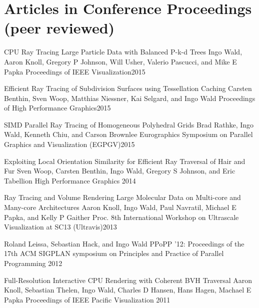 \documentclass[letterpaper,11pt]{moderncv}
\begin{document}
\medskip
\section{Articles in Conference Proceedings  (peer reviewed)}


  \cvbibitem 
    {CPU Ray Tracing Large Particle Data with Balanced P-k-d Trees}
    {Ingo Wald, Aaron Knoll, Gregory P Johnson, Will Usher, Valerio Pascucci, and Mike E Papka}
    {Proceedings of IEEE Visualization}{2015}

  \cvbibitem 
    {Efficient Ray Tracing of Subdivision Surfaces using Tessellation Caching}
    {Carsten Benthin, Sven Woop, Matthias Niessner, Kai Selgard, and Ingo Wald}
    {Proceedings of High Performance Graphics}{2015}

  \cvbibitem 
    {SIMD Parallel Ray Tracing of Homogeneous Polyhedral Grids}
    {Brad Rathke, Ingo Wald, Kenneth Chiu, and Carson Brownlee}
    {Eurographics Symposium on Parallel Graphics and Visualization (EGPGV)}{2015}

  \cvbibitem 
{Exploiting Local Orientation Similarity for Efficient Ray Traversal of Hair and Fur }{Sven Woop, Carsten Benthin, Ingo Wald, Gregory S Johnson, and Eric Tabellion} 
{High Performance Graphics 2014}{}

  \cvbibitem 
    {Ray Tracing and Volume Rendering Large Molecular Data on Multi-core and Many-core Architectures}
    {Aaron Knoll, Ingo Wald, Paul Navratil, Michael E Papka, and Kelly P Gaither}
    {Proc. 8th International Workshop on Ultrascale Visualization at SC13 (Ultravis)}{2013}

{Roland Leissa, Sebastian Hack, and Ingo Wald}
{PPoPP '12: Proceedings of the 17th ACM SIGPLAN symposium on Principles and Practice of Parallel Programming 2012}
{}

\cvbibitem
{Full-Resolution Interactive CPU Rendering
with Coherent BVH Traversal}
{
Aaron Knoll, 
Sebastian Thelen,
Ingo Wald,
Charles D Hansen,
Hans Hagen,
Machael E Papka}
{Proceedings of IEEE Pacific Visualization 2011}
{}
\end{document}
